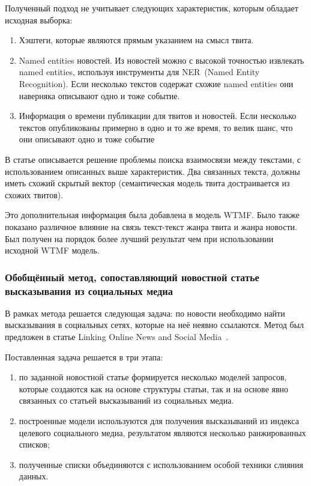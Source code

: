            Полученный подход не учитывает следующих характеристик, которым обладает исходная выборка:
            \begin{enumerate}
                \item Хэштеги, которые являются прямым указанием на смысл твита.
                \item {\color{red} Named entities} новостей. Из новостей можно с высокой точностью извлекать {\color{red} named entities}, используя инструменты для NER~(Named Entity Recognition). Если несколько текстов содержат схожие {\color{red} named entities} они наверняка описывают одно и тоже событие.
                \item Информация о времени публикации для твитов и новостей. Если несколько текстов опубликованы примерно в одно и то же время, то велик шанс, что они описывают одно и тоже событие
            \end{enumerate}
            В статье описывается решение проблемы поиска взаимосвязи между текстами, с использованием описанных выше характеристик. Два связанных текста, должны иметь схожий скрытый вектор (семантическая модель твита достраивается из схожих твитов).

            Это дополнительная информация была добавлена в модель WTMF. Было также показано различное влияние на связь текст-текст жанра твита и жанра новости. Был получен на порядок более лучший результат чем при использовании исходной WTMF модель.

    \subsubsection{Обобщённый метод, сопоставляющий новостной статье высказывания из социальных медиа}
        В рамках метода решается следующая задача: по новости необходимо найти высказывания в социальных сетях, которые на неё неявно ссылаются.
        Метод был предложен в статье Linking Online News and Social Media~\cite{linking_news_media}.

        Поставленная задача решается в три этапа:
        \begin{enumerate}
            \item по заданной новостной статье формируется несколько моделей запросов, которые создаются как на основе структуры статьи,
                так и на основе явно связанных со статьей высказываний из социальных медиа.
            \item построенные модели используются для получения высказываний из индекса целевого социального медиа, результатом являются несколько ранжированных списков;
            \item полученные списки объединяются с использованием особой техники слияния данных.
        \end{enumerate}

